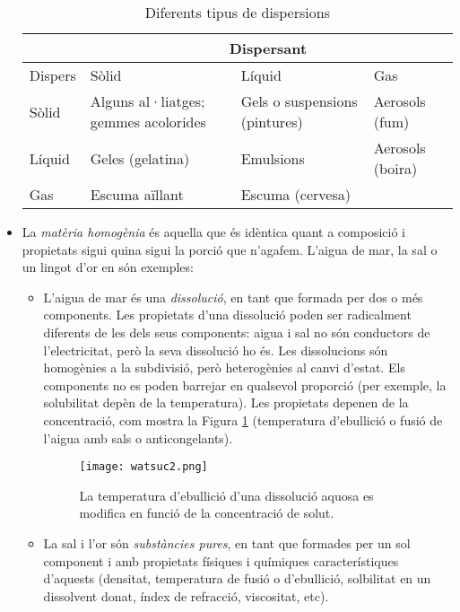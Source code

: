 \begin{itemize}
\begin{table}[h!]
  \begin{center}
    \caption{Diferents tipus de dispersions}
    \label{tab:colloid}
    \begin{tabular}{l|l|l|l}
      & \multicolumn{3}{c}{Dispersant}\\ 
      \hline
      Dispers & Sòlid & Líquid & Gas\\
      \hline
      Sòlid & Alguns al·liatges; gemmes acolorides & Gels o suspensions (pintures) & Aerosols (fum) \\
      Líquid & Geles (gelatina) & Emulsions & Aerosols (boira) \\
      Gas & Escuma aïllant & Escuma (cervesa) & \\
      \hline
    \end{tabular}
  \end{center}
\end{table}
\item La \emph{matèria homogènia} és aquella que és idèntica quant a composició i propietats sigui quina sigui la porció que n'agafem. L'aigua de mar, la sal o un lingot d'or en són exemples:
\begin{itemize}
\item L'aigua de mar és una \emph{dissolució}, en tant que formada per dos o més components. Les propietats d'una dissolució poden ser radicalment diferents de les dels seus components: aigua i sal no són conductors de l'electricitat, però la seva dissolució ho és. Les dissolucions són homogènies a la subdivisió, però heterogènies al canvi d'estat. Els components no es poden barrejar en qualsevol proporció (per exemple, la solubilitat depèn de la temperatura). Les propietats depenen de la concentració, com mostra la Figura \ref{fig:watsuc2} (temperatura d'ebullició o fusió de l'aigua amb sals o anticongelants).
\begin{figure}[h]
\centering
\texttt{[image: watsuc2.png]}
\caption{La temperatura d'ebullició d'una dissolució aquosa es modifica en funció de la concentració de solut.}
\label{fig:watsuc2}
\end{figure}
\item La sal i l'or són \emph{substàncies pures}, en tant que formades per un sol component i amb propietats físiques i químiques característiques d'aquests (densitat, temperatura de fusió o d'ebullició, solbilitat en un dissolvent donat, índex de refracció, viscositat, etc).
\end{itemize}
\end{itemize}


